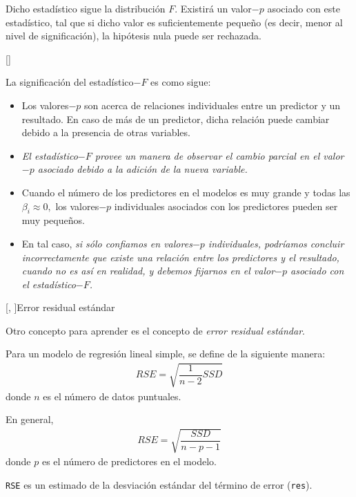Dicho estadístico sigue la distribución $F$.
Existirá un valor$-p$ asociado con este estadístico, tal que si dicho valor es suficientemente pequeño (es decir, menor al nivel de significación), la hipótesis nula puede ser rechazada.


[]

La significación del estadístico$-F$ es como sigue:
\begin{itemize}
 \item Los valores$-p$ son acerca de relaciones individuales entre un predictor y un resultado. En caso de más de un predictor, dicha relación puede cambiar debido a la presencia de otras variables.
 

 \item
 \emph{El estadístico$-F$ provee un manera de observar el cambio parcial en el valor$-p$ asociado debido a la adición de la nueva variable.}


 \item Cuando el número de los predictores en el modelos es muy grande y todas las $\beta_{i}\approx 0,$ los valores$-p$ individuales asociados con los predictores pueden ser muy pequeños.
 

 \item
 En tal caso, \emph{si sólo confiamos en valores$-p$ individuales, podríamos concluir incorrectamente que existe una relación entre los predictores y el resultado, cuando no es así en realidad, y debemos fijarnos en el valor$-p$ asociado con el estadístico$-F$.}
\end{itemize}



[, ]{Error residual estándar}

Otro concepto para aprender es el concepto de \emph{error residual estándar}.



Para un modelo de regresión lineal simple, se define de la siguiente manera:
\begin{align}
 RSE = \sqrt{\dfrac{1}{n-2}SSD}
\end{align}
donde $n$ es el número de datos puntuales.



En general,
\begin{align}
 RSE = \sqrt{\dfrac{SSD}{n-p-1}}
\end{align}
donde $p$ es el número de predictores en el modelo.



\texttt{RSE} es un estimado de la desviación estándar del término de error (\texttt{res}).


